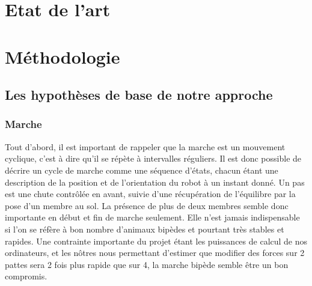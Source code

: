 \documentclass[journal, a4paper]{IEEEtran}
\begin{document}

\section{Etat de l'art}\label{sec:etat-de-l'art}



\section{Méthodologie}\label{sec:met}
	\subsection{Les hypothèses de base de notre approche}\label{subsec:les-hypotheses-de-base-de-notre-approche}


	\subsubsection{Marche}
	Tout d'abord, il est important de rappeler que la marche est un
	mouvement cyclique, c'est à dire qu'il se répète à intervalles
	réguliers. Il est donc possible de décrire un cycle de marche
	comme une séquence d'états, chacun étant une description de la
	position et de l'orientation du robot à un instant donné.
	Un pas est une chute contrôlée en avant, suivie d'une récupération
	de l'équilibre par la pose d'un membre au sol.
	La présence de plus de deux membres semble donc importante en début
	et fin de marche seulement. Elle n'est jamais indispensable si l'on
	se réfère à bon nombre d'animaux bipèdes et pourtant très stables et
	rapides.
	Une contrainte importante du projet étant les puissances de calcul
	de nos ordinateurs, et les nôtres nous permettant d'estimer que
	modifier des forces sur 2 pattes sera 2 fois plus rapide que sur 4,
	la marche bipède semble être un bon compromis.
\end{document}
